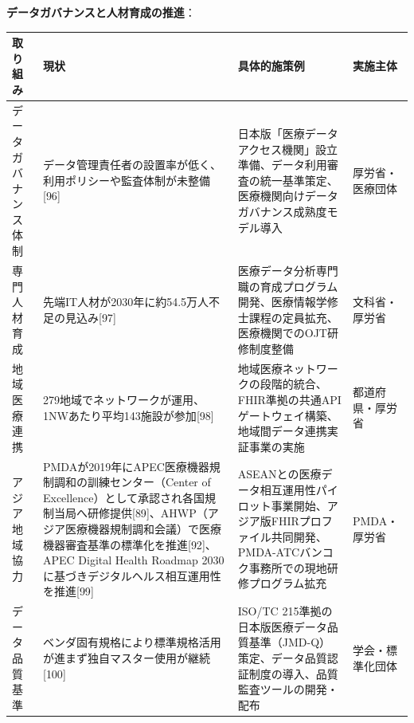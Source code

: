 \documentclass[
  a4paper,
  a4paper,
  11pt]{ltjsbook}
\begin{document}
\textbf{データガバナンスと人材育成の推進}：

\begin{longtable}[]{@{}
  >{\raggedright\arraybackslash}p{}
  >{\raggedright\arraybackslash}p{}
  >{\raggedright\arraybackslash}p{}
  >{\raggedright\arraybackslash}p{}@{}}
\toprule\noalign{}
\begin{minipage}[b]{\linewidth}\raggedright
取り組み
\end{minipage} & \begin{minipage}[b]{\linewidth}\raggedright
現状
\end{minipage} & \begin{minipage}[b]{\linewidth}\raggedright
具体的施策例
\end{minipage} & \begin{minipage}[b]{\linewidth}\raggedright
実施主体
\end{minipage} \\
\midrule\noalign{}
\endhead
\bottomrule\noalign{}
\endlastfoot
データガバナンス体制 &
データ管理責任者の設置率が低く、利用ポリシーや監査体制が未整備{[}96{]} &
日本版「医療データアクセス機関」設立準備、データ利用審査の統一基準策定、医療機関向けデータガバナンス成熟度モデル導入
& 厚労省・医療団体 \\
専門人材育成 & 先端IT人材が2030年に約54.5万人不足の見込み{[}97{]} &
医療データ分析専門職の育成プログラム開発、医療情報学修士課程の定員拡充、医療機関でのOJT研修制度整備
& 文科省・厚労省 \\
地域医療連携 &
279地域でネットワークが運用、1NWあたり平均143施設が参加{[}98{]} &
地域医療ネットワークの段階的統合、FHIR準拠の共通APIゲートウェイ構築、地域間データ連携実証事業の実施
& 都道府県・厚労省 \\
アジア地域協力 &
PMDAが2019年にAPEC医療機器規制調和の訓練センター（Center of
Excellence）として承認され各国規制当局へ研修提供{[}89{]}、AHWP（アジア医療機器規制調和会議）で医療機器審査基準の標準化を推進{[}92{]}、APEC
Digital Health Roadmap
2030に基づきデジタルヘルス相互運用性を推進{[}99{]} &
ASEANとの医療データ相互運用性パイロット事業開始、アジア版FHIRプロファイル共同開発、PMDA-ATCバンコク事務所での現地研修プログラム拡充
& PMDA・厚労省 \\
データ品質基準 &
ベンダ固有規格により標準規格活用が進まず独自マスター使用が継続{[}100{]}
& ISO/TC
215準拠の日本版医療データ品質基準（JMD-Q）策定、データ品質認証制度の導入、品質監査ツールの開発・配布
& 学会・標準化団体 \\
\end{longtable}
\end{document}

